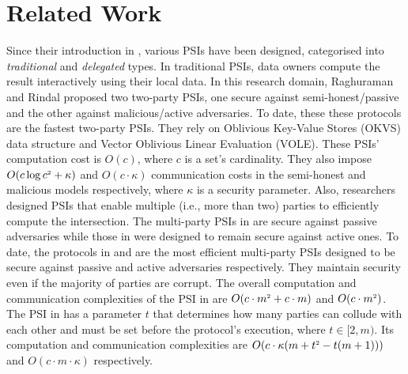 

\vspace{-2.5mm}
\section{Related Work}\label{sec::related-work}
\vspace{-1mm}

Since their introduction in \cite{DBLP:conf/eurocrypt/FreedmanNP04}, various PSIs have been designed, categorised into \textit{traditional} and \textit{delegated} types.  
%
In traditional PSIs, data owners compute the result interactively using their local data.
%
In this research domain, Raghuraman and Rindal \cite{RaghuramanR22} proposed two two-party PSIs, one secure against semi-honest/passive and the other against malicious/active adversaries. To date, these these protocols are the fastest two-party PSIs. They rely on  Oblivious Key-Value Stores (OKVS) data structure and Vector Oblivious Linear Evaluation (VOLE). These PSIs' computation cost is $O(c)$, where $c$ is  a set's cardinality.  They also impose $O(c\log c^{\scriptscriptstyle 2}+\kappa)$ and $O(c\cdot \kappa)$ communication costs in the semi-honest and malicious models respectively, 
where 
$\kappa$ is a security parameter.  
%
Also, researchers designed PSIs that enable multiple (i.e., more than two) parties to efficiently compute the intersection. The multi-party PSIs in  \cite{DBLP:conf/scn/InbarOP18,DBLP:conf/ccs/KolesnikovMPRT17} are secure against  passive adversaries while those in \cite{Ben-EfraimNOP21,GhoshN19,ZhangLLJL19,DBLP:conf/ccs/KolesnikovMPRT17,NevoTY21} were designed to remain secure against active ones. 
%
%
To date, the  protocols  in   \cite{DBLP:conf/ccs/KolesnikovMPRT17} and  \cite{NevoTY21} are the most  efficient multi-party PSIs  designed to be  secure against passive and active  adversaries respectively. They maintain security even if  the majority of parties are corrupt.  The overall computation and communication complexities of the PSI in  \cite{DBLP:conf/ccs/KolesnikovMPRT17} are  $O(c\cdot m^{\scriptscriptstyle 2}+c\cdot m )$ and $O(c\cdot m^{\scriptscriptstyle 2})$. 
%
%
The PSI in \cite{NevoTY21} has a parameter $t$ that determines how many parties can collude with each other and must be set before the protocol's execution, where $t\in [2, m)$.  
%
%
Its computation and communication complexities are $O(c\cdot \kappa(m+t^{\scriptscriptstyle 2}-t(m+1)))$ and $O(c\cdot m\cdot \kappa)$ respectively.


